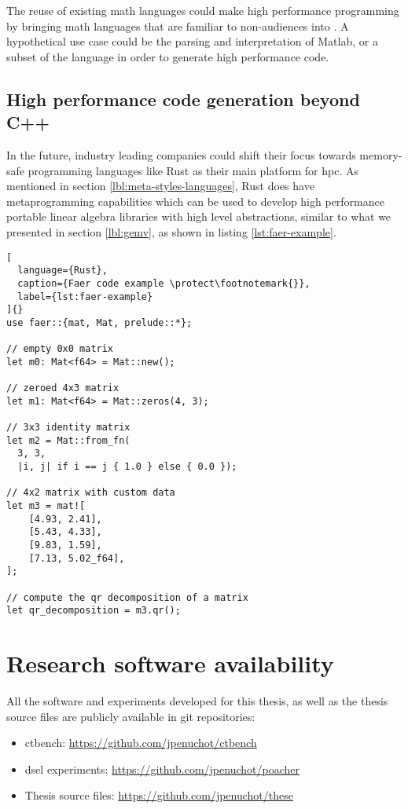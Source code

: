 \documentclass[main]{subfiles}
\begin{document}
The reuse of existing math languages could make high performance programming
by bringing math languages that are familiar to non-\cpp audiences into \cpp.
A hypothetical use case could be the parsing and interpretation of Matlab,
or a subset of the language in order to generate high performance code.

\subsection*{High performance code generation beyond C++}

In the future, industry leading companies could shift their focus towards
memory-safe programming languages like Rust as their main platform for
\gls{hpc}.
As mentioned in section \ref{lbl:meta-styles-languages}, Rust does have
metaprogramming capabilities which can be used to develop high performance
portable linear algebra libraries \cite{faer} with high level abstractions,
similar to what we presented in section \ref{lbl:gemv}, as shown in
listing \ref{lst:faer-example}.

\begin{lstlisting}[
  language={Rust},
  caption={Faer code example \protect\footnotemark{}},
  label={lst:faer-example}
]{}
use faer::{mat, Mat, prelude::*};

// empty 0x0 matrix
let m0: Mat<f64> = Mat::new();

// zeroed 4x3 matrix
let m1: Mat<f64> = Mat::zeros(4, 3);

// 3x3 identity matrix
let m2 = Mat::from_fn(
  3, 3,
  |i, j| if i == j { 1.0 } else { 0.0 });

// 4x2 matrix with custom data
let m3 = mat![
    [4.93, 2.41],
    [5.43, 4.33],
    [9.83, 1.59],
    [7.13, 5.02_f64],
];

// compute the qr decomposition of a matrix
let qr_decomposition = m3.qr();
\end{lstlisting}


\section*{Research software availability}

All the software and experiments developed for this thesis,
as well as the thesis source files are publicly available in git repositories:

\begin{itemize}
\item ctbench: \url{https://github.com/jpenuchot/ctbench}
\item \gls{dsel} experiments: \url{https://github.com/jpenuchot/poacher}
\item Thesis source files: \url{https://github.com/jpenuchot/these}
\end{itemize}
\end{document}
